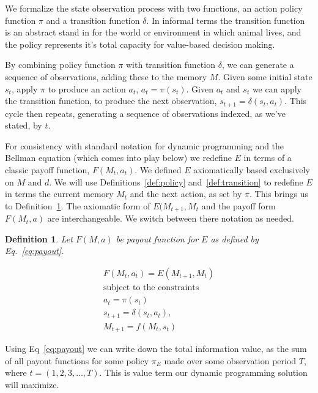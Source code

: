 \documentclass[9pt,twocolumn,twoside]{pnas-new}
\newtheorem{definition}{Definition}
\begin{document}
We formalize the state observation process with two functions, an action policy function $\pi$ and a transition function $\delta$. In informal terms the transition function is an abstract stand in for the world or environment in which animal lives, and the policy represents it's total capacity for value-based decision making.

By combining policy function $\pi$ with transition function $\delta$, we can generate a sequence of observations, adding these to the memory $M$. Given some initial state $s_{t}$, apply $\pi$ to produce an action $a_t$, $a_t = \pi(s_{t})$. Given $a_t$ and $s_{t}$ we can apply the transition function, to produce the next observation, $s_{t+1} = \delta (s_{t},a_t)$. This cycle then repeats, generating a sequence of observations indexed, as we've stated, by $t$.

For consistency with standard notation for dynamic programming and the Bellman equation (which comes into play below) we redefine $E$ in terms of a classic payoff function, $F(M_{t}, a_t)$. We defined $E$ axiomatically based exclusively on $M$ and $d$. We will use Definitions~\ref{def:policy} and~\ref{def:transition} to redefine $E$ in terms the current memory $M_{t}$ and the next action, as set by $\pi$. This brings us to Definition~\ref{def:payoff}. The axiomatic form of $E(M_{t+1},M_{t}$ and the payoff form $F(M_t, a)$ are interchangeable. We switch between there notation as needed.

\begin{definition}
    \label{def:payoff}
    Let $F(M, a)$ be payout function for $E$ as defined by Eq.~\ref{eq:payout}.
\end{definition}

\begin{equation}
    \begin{split} \label{eq:payout}
    F(M_{t}, a_t) = E(M_{t+1}, M_{t})\\
    \text{subject to the constraints} \\
    a_{t} = \pi(s_t) \\
    s_{t+1} = \delta(s_{t}, a_t),\\ 
    M_{t+1} = f(M_{t}, s_{t})
    \end{split} 
\end{equation}

Using Eq~\ref{eq:payout} we can write down the total information value, as the sum of all payout functions for some policy $\pi_E$ made over some observation period $T$, where $t = (1,2,3,\ldots,T)$. This is value term our dynamic programming solution will maximize.
\end{document}
